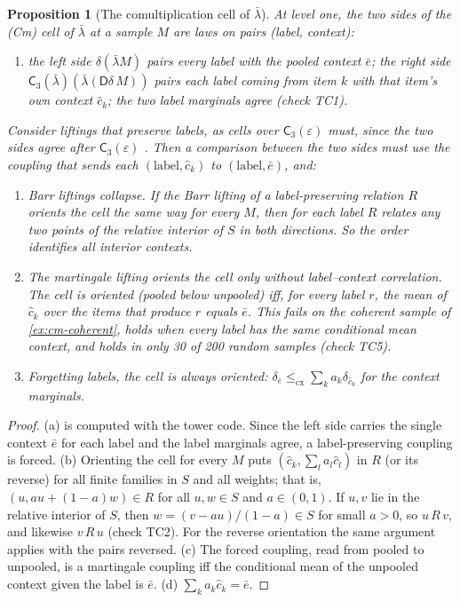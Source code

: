 \documentclass[11pt]{article}
\newtheorem{proposition}[theorem]{Proposition}
\theoremstyle{definition}
\newcommand{\D}{\mathsf D}
\newcommand{\C}{\mathsf C}
\newcommand{\lb}{\bar\lambda}
\newcommand{\cx}{\le_{\mathrm{cx}}}
\begin{document}
\begin{proposition}[The comultiplication cell of $\lb$]\label{prop:cm-cell}
At level one, the two sides of the (Cm) cell of $\lb$ at a sample $M$ are laws on pairs (label, context):
\begin{enumerate}[label=(\alph*)]
\item the left side $\delta(\lb M)$ pairs every label with the pooled context $\bar e$; the right side $\C_3(\lb)(\lb(\D\delta\,M))$ pairs
  each label coming from item $k$ with that item's own context $\hat c_k$; the two label marginals agree (check TC1).
\end{enumerate}
Consider liftings that preserve labels, as cells over $\C_3(\varepsilon)$ must, since the two sides agree after $\C_3(\varepsilon)$
\cite[Thm.~8.7]{Tower}. Then a comparison between the two sides must use the coupling that sends each $(\text{label},\hat c_k)$ to
$(\text{label},\bar e)$, and:
\begin{enumerate}[label=(\alph*),resume]
\item \emph{Barr liftings collapse.} If the Barr lifting of a label-preserving relation $R$ orients the cell the same way for every $M$,
  then for each label $R$ relates any two points of the relative interior of $S$ in both directions. So the order identifies all
  interior contexts.
\item \emph{The martingale lifting orients the cell only without label--context correlation.} The cell is oriented (pooled below
  unpooled) iff, for every label $r$, the mean of $\hat c_k$ over the items that produce $r$ equals $\bar e$. This fails on the
  coherent sample of \cref{ex:cm-coherent}, holds when every label has the same conditional mean context, and holds in only 30 of 200
  random samples (check TC5).
\item \emph{Forgetting labels, the cell is always oriented}: $\delta_{\bar e}\cx\sum_ka_k\delta_{\hat c_k}$ for the context marginals.
\end{enumerate}
\end{proposition}
\begin{proof}
(a) is computed with the tower code. Since the left side carries the single context $\bar e$ for each label and the label marginals
agree, a label-preserving coupling is forced. (b) Orienting the cell for every $M$ puts $(\hat c_k,\sum_la_l\hat c_l)$ in $R$ (or its
reverse) for all finite families in $S$ and all weights; that is, $(u,au+(1-a)w)\in R$ for all $u,w\in S$ and $a\in(0,1)$. If $u,v$ lie in
the relative interior of $S$, then $w=(v-au)/(1-a)\in S$ for small $a>0$, so $u\,R\,v$, and likewise $v\,R\,u$ (check TC2). For the reverse
orientation the same argument applies with the pairs reversed. (c) The forced coupling, read from pooled to unpooled, is a martingale
coupling iff the conditional mean of the unpooled context given the label is $\bar e$. (d) $\sum_ka_k\hat c_k=\bar e$.
\end{proof}
\end{document}
